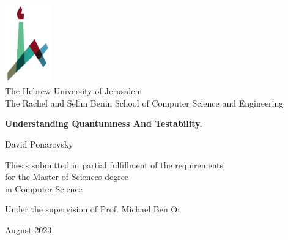 \documentclass[11pt, oneside]{book}
\begin{document}

\begin{titlepage}
    \begin{center}
        \vspace*{1cm}
        
        \includegraphics[width=0.15\textwidth]{huji_logo_notext.pdf}\\
        { \large The Hebrew University of Jerusalem\\
        The Rachel and Selim Benin School of Computer Science and Engineering }
        
        \vspace{2cm}
        
        {\huge \textbf{Understanding Quantumness And Testability.}}
        
        \vspace{1cm}
        
        \vspace{1.5cm}
        
        { \large David Ponarovsky }
        
        \vspace{1cm}
        
        { \large Thesis submitted in partial fulfillment of the requirements\\for the Master of Sciences degree\\
        in Computer Science } 
        
        \vspace{1cm}
        
        { \large  Under the supervision of Prof. Michael Ben Or }

        
        \vfill
        
        {\large August 2023 }
    \end{center}
\end{titlepage}




%

\tableofcontents
\listoffigures
\setlength{\parindent}{0pt}
\setlength{\parskip}{5pt}
% 


 





\printbibliography[heading=bibliography]
\end{document}
